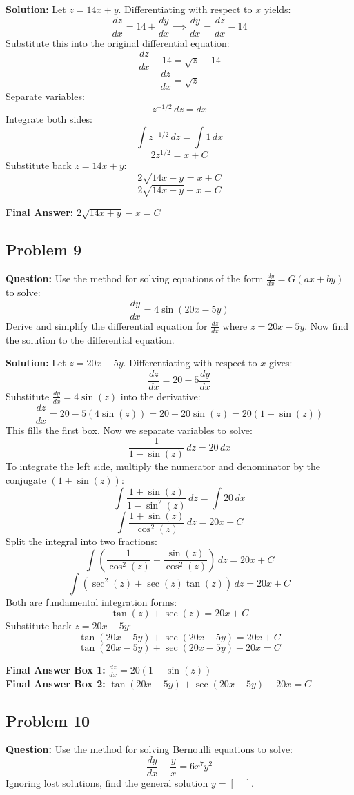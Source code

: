 \documentclass[11pt]{article}
\begin{document}
\textbf{Solution:}
Let $z = 14x + y$. Differentiating with respect to $x$ yields:
\[ \frac{dz}{dx} = 14 + \frac{dy}{dx} \implies \frac{dy}{dx} = \frac{dz}{dx} - 14 \]
Substitute this into the original differential equation:
\[ \frac{dz}{dx} - 14 = \sqrt{z} - 14 \]
\[ \frac{dz}{dx} = \sqrt{z} \]
Separate variables:
\[ z^{-1/2} \, dz = dx \]
Integrate both sides:
\[ \int z^{-1/2} \, dz = \int 1 \, dx \]
\[ 2z^{1/2} = x + C \]
Substitute back $z = 14x + y$:
\[ 2\sqrt{14x + y} = x + C \]
\[ 2\sqrt{14x + y} - x = C \]

\textbf{Final Answer:} $2\sqrt{14x + y} - x = C$

\vspace{0.5cm}
\subsection*{Problem 9}
\textbf{Question:} Use the method for solving equations of the form $\frac{dy}{dx} = G(ax+by)$ to solve:
\[ \frac{dy}{dx} = 4\sin(20x - 5y) \]
Derive and simplify the differential equation for $\frac{dz}{dx}$ where $z = 20x - 5y$.
Now find the solution to the differential equation.

\textbf{Solution:}
Let $z = 20x - 5y$. Differentiating with respect to $x$ gives:
\[ \frac{dz}{dx} = 20 - 5\frac{dy}{dx} \]
Substitute $\frac{dy}{dx} = 4\sin(z)$ into the derivative:
\[ \frac{dz}{dx} = 20 - 5(4\sin(z)) = 20 - 20\sin(z) = 20(1 - \sin(z)) \]
This fills the first box. Now we separate variables to solve:
\[ \frac{1}{1 - \sin(z)} \, dz = 20 \, dx \]
To integrate the left side, multiply the numerator and denominator by the conjugate $(1 + \sin(z))$:
\[ \int \frac{1 + \sin(z)}{1 - \sin^2(z)} \, dz = \int 20 \, dx \]
\[ \int \frac{1 + \sin(z)}{\cos^2(z)} \, dz = 20x + C \]
Split the integral into two fractions:
\[ \int \left(\frac{1}{\cos^2(z)} + \frac{\sin(z)}{\cos^2(z)}\right) \, dz = 20x + C \]
\[ \int (\sec^2(z) + \sec(z)\tan(z)) \, dz = 20x + C \]
Both are fundamental integration forms:
\[ \tan(z) + \sec(z) = 20x + C \]
Substitute back $z = 20x - 5y$:
\[ \tan(20x - 5y) + \sec(20x - 5y) = 20x + C \]
\[ \tan(20x - 5y) + \sec(20x - 5y) - 20x = C \]

\textbf{Final Answer Box 1:} $\frac{dz}{dx} = 20(1 - \sin(z))$ \\
\textbf{Final Answer Box 2:} $\tan(20x - 5y) + \sec(20x - 5y) - 20x = C$

\vspace{0.5cm}
\subsection*{Problem 10}
\textbf{Question:} Use the method for solving Bernoulli equations to solve:
\[ \frac{dy}{dx} + \frac{y}{x} = 6x^7 y^2 \]
Ignoring lost solutions, find the general solution $y = [\quad]$.
\end{document}
